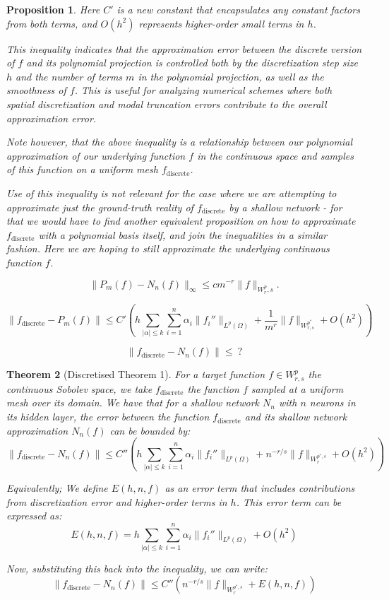 \documentclass[11pt,a4paper]{article}
\theoremstyle{plain}
\newtheorem{theorem}{Theorem}[section]
\newtheorem{proposition}[theorem]{Proposition}
\theoremstyle{definition}
\theoremstyle{remark}
\begin{document}
\begin{proposition}
Here \(C'\) is a new constant that encapsulates any constant factors from both terms, and \(O(h^2)\) represents higher-order small terms in \(h\).

This inequality indicates that the approximation error between the discrete version of \(f\) and its polynomial projection is controlled both by the discretization step size \(h\) and the number of terms \(m\) in the polynomial projection, as well as the smoothness of \(f\). This is useful for analyzing numerical schemes where both spatial discretization and modal truncation errors contribute to the overall approximation error.

Note however, that the above inequality is a relationship between our polynomial approximation of our underlying function \(f\) in the continuous space and samples of this function on a uniform mesh \(f_{\text{discrete} }\). 

Use of this inequality is not relevant for the case where we are attempting to approximate just the ground-truth reality of \(f_{\text{discrete} }\) by a shallow network - for that we would have to find another equivalent proposition on how to approximate \(f_{\text{discrete} }\) with a polynomial basis itself, and join the inequalities in a similar fashion. Here we are hoping to still approximate the underlying continuous function \(f\).

\[
    \| P_m(f) - N_n(f) \|_{\infty} \leq cm^{-r} \| f \|_{W_r^p, s}.
\]

\[
    \|f_{\text{discrete}} - P_m(f)\| \leq C'\left(h \sum_{|\alpha| \leq k} \sum_{i=1}^n \alpha_i \|f_i''\|_{L^p(\Omega)} + \frac{1}{m^r} \|f\|_{W^{p^*}_{r,s}} + O(h^2)\right)
\]

\[
    \| f_{\text{discrete} } - N_{n}(f) \| \leq \ ?
\]

\end{proposition}

\begin{theorem}[Discretised Theorem 1]

    For a target function \(f \in W^{p}_{r,s}\) the continuous Sobolev space, we take \(f_{\text{discrete} } \) the function \(f\) sampled at a uniform mesh over its domain. We have that for a shallow network \(N_n\) with \(n\) neurons in its hidden layer, the error between the function \(f_{\text{discrete} }\) and its shallow network approximation \(N_n(f)\) can be bounded by:
    \[
   \|f_{\text{discrete}} - N_n(f)\| \leq C'' \left( h \sum_{|\alpha| \leq k} \sum_{i=1}^n \alpha_i \|f_i''\|_{L^p(\Omega)} + n^{-r/s} \|f\|_{W^{p^*,s}_r} + O(h^2) \right)
    \]

    Equivalently;
    We define \( E(h, n, f) \) as an error term that includes contributions from discretization error and higher-order terms in \( h \). This error term can be expressed as:
    \[
    E(h, n, f) = h \sum_{|\alpha| \leq k} \sum_{i=1}^n \alpha_i \|f_i''\|_{L^p(\Omega)} + O(h^2)
    \]

    Now, substituting this back into the inequality, we can write:
    \[
    \|f_{\text{discrete}} - N_n(f)\| \leq C'' \left( n^{-r/s} \|f\|_{W^{p^*,s}_r} + E(h, n, f) \right)
    \]
    
\end{theorem}
\end{document}
